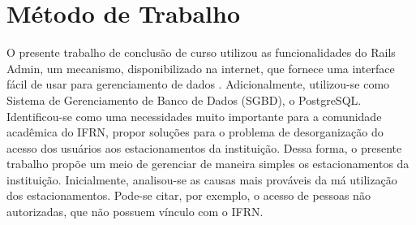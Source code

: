 





\section{Método de Trabalho}

O presente trabalho de conclusão de curso utilizou as funcionalidades do Rails Admin, 
um mecanismo, disponibilizado na internet, que fornece uma interface fácil de usar para gerenciamento de dados \cite{adminGitHub2018}. Adicionalmente, utilizou-se como Sistema de Gerenciamento de Banco de Dados (SGBD), o PostgreSQL. Identificou-se como uma necessidades muito importante para a comunidade acadêmica do IFRN, propor soluções para o problema de desorganização do acesso dos usuários aos estacionamentos da instituição. Dessa forma, o presente trabalho propõe um meio de gerenciar de maneira simples os estacionamentos da instituição. 
Inicialmente, analisou-se as causas mais prováveis da má utilização dos estacionamentos. Pode-se citar, por exemplo, o acesso de pessoas não autorizadas, que não possuem vínculo com o IFRN.

